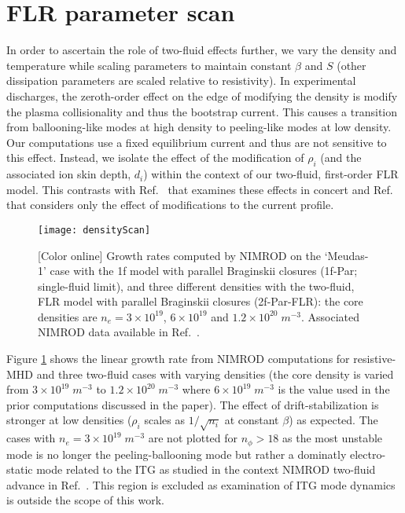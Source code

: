 \section{FLR parameter scan}
\label{sec:densityScan}

In order to ascertain the role of two-fluid effects further, we vary the
density and temperature while scaling parameters to maintain
constant $\beta$ and $S$ (other dissipation parameters are scaled relative to
resistivity). In experimental discharges, the zeroth-order effect on the edge
of modifying the density is modify the plasma collisionality and thus the
bootstrap current. This causes a transition from ballooning-like modes at high
density to peeling-like modes at low density. Our computations use a fixed
equilibrium current and thus are not sensitive to this effect. Instead, we
isolate the effect of the modification of $\rho_i$ (and the associated ion
skin depth, $d_i$) within the context of our two-fluid, first-order FLR model.
This contrasts with Ref.~\cite{xu14} that examines these effects in concert
and Ref.~\cite{Zhu12} that considers only the effect of modifications
to the current profile.

\begin{figure}
  \centering
  \texttt{[image: densityScan]}
  \vspace{-4mm}
  \caption{[Color online]
  Growth rates computed by NIMROD on the `Meudas-1' case with the 1f model
  with parallel Braginskii closures (1f-Par; single-fluid limit), and three
  different densities with the two-fluid, FLR model with parallel Braginskii
  closures (2f-Par-FLR): the core densities are $n_e=3\times10^{19}$,
  $6\times10^{19}$ and $1.2\times10^{20}\;m^{-3}$.
  Associated NIMROD data available in Ref.~\cite{king16Z}.}
  \label{densityScan}
\end{figure}

Figure \ref{densityScan} shows the linear growth rate from NIMROD computations
for resistive-MHD and three two-fluid cases with varying densities (the
core density is varied from $3\times10^{19}\;m^{-3}$ to
$1.2\times10^{20}\;m^{-3}$ where $6\times10^{19}\;m^{-3}$ is the value used in
the prior computations discussed in the paper). The effect of
drift-stabilization is stronger at low densities ($\rho_i$ scales as
$1/\sqrt{n_i}$ at constant $\beta$) as expected. The cases with
$n_e=3\times10^{19}\;m^{-3}$ are not plotted for $n_\phi>18$ as the most unstable
mode is no longer the peeling-ballooning mode but rather a dominatly
electro-static mode related to the ITG as studied in the context NIMROD
two-fluid advance in Ref.~\cite{Schnack13}. This region is excluded as
examination of ITG mode dynamics is outside the scope of this work.


